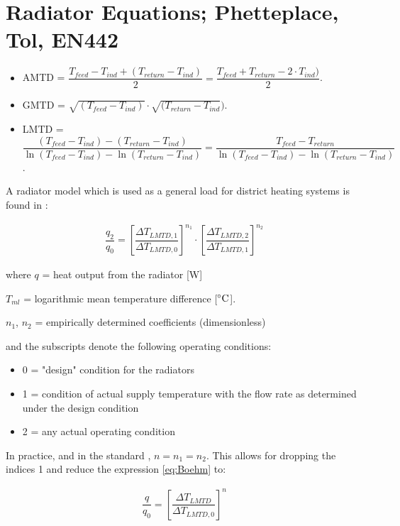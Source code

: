\section{Radiator Equations; Phetteplace, Tol, EN442}
\label{app::radeq}

\begin{itemize}
	\item AMTD = $\dfrac{T_{feed} - T_{ind} + (T_{return} - T_{ind})}{2} = 
	\dfrac{T_{feed} + T_{return} - 2 \cdot T_{ind})}{2}$.
	\item GMTD = $\sqrt{(T_{feed} - T_{ind})} \cdot  \sqrt{(T_{return} - T_{ind}})$.
	\item LMTD = $\dfrac{(T_{feed} - T_{ind}) - (T_{return} - T_{ind})}{\ln(T_{feed} - T_{ind}) -\ln(T_{return} - T_{ind})} = \dfrac{T_{feed} - T_{return}}{\ln(T_{feed} - T_{ind}) -\ln(T_{return} - T_{ind})}$.
\end{itemize}

A radiator model which is used as  a general load for district heating systems is found in \cite{etde_6539997}:

\begin{equation}
	\begin{aligned}
		\dfrac{q_2}{q_0} = \left[\dfrac{\Delta T_{LMTD,1}}{\Delta T_{LMTD,0}}\right]^{n_1} \cdot \left[\dfrac{\Delta T_{LMTD,2}}{\Delta T_{LMTD,1}}\right]^{n_2}
	\end{aligned}
	\label{eq:Boehm}
\end{equation}

where $q$ = heat output from the radiator [W]

$T_{ml}$ = logarithmic mean temperature difference [$^\circ\mathrm{C}$].

$n_1$, $n_2$ = empirically determined coefficients (dimensionless)

and the subscripts denote the following operating conditions:
\begin{itemize} %
	\item[] 0 = "design" condition for the radiators
	\item[] 1 = condition of actual supply temperature with the flow rate as determined under the design condition
	\item[] 2 = any actual operating condition
\end{itemize}


In practice, and in the standard \cite{NEN442}, $n = n_1 = n_2$. This allows for dropping the indices  1 and reduce the expression \ref{eq:Boehm} to:

\begin{equation}
	\begin{aligned}
		\dfrac{q}{q_0} = \left[\dfrac{\Delta T_{LMTD}}{\Delta T_{LMTD,0}}\right]^{n}
	\end{aligned}
	\label{eq:Boehm442}
\end{equation}

